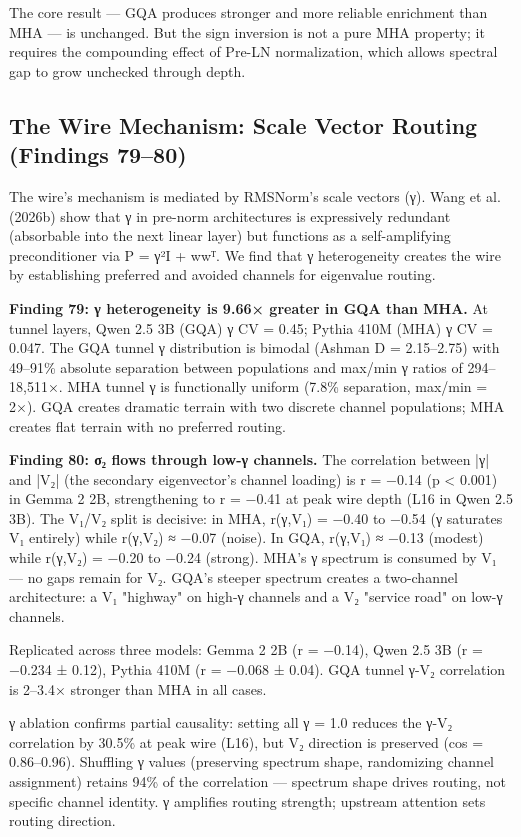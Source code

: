 \documentclass[12pt]{article}
\begin{document}
The core result — GQA produces stronger and more reliable enrichment than MHA — is unchanged. But the sign inversion is not a pure MHA property; it requires the compounding effect of Pre-LN normalization, which allows spectral gap to grow unchecked through depth.

\subsection{The Wire Mechanism: Scale Vector Routing (Findings 79–80)}

The wire's mechanism is mediated by RMSNorm's scale vectors (γ). Wang et al. (2026b) show that γ in pre-norm architectures is expressively redundant (absorbable into the next linear layer) but functions as a self-amplifying preconditioner via P = γ²I + wwᵀ. We find that γ heterogeneity creates the wire by establishing preferred and avoided channels for eigenvalue routing.

\textbf{Finding 79: γ heterogeneity is 9.66× greater in GQA than MHA.} At tunnel layers, Qwen 2.5 3B (GQA) γ CV = 0.45; Pythia 410M (MHA) γ CV = 0.047. The GQA tunnel γ distribution is bimodal (Ashman D = 2.15–2.75) with 49–91\% absolute separation between populations and max/min γ ratios of 294–18,511×. MHA tunnel γ is functionally uniform (7.8\% separation, max/min = 2×). GQA creates dramatic terrain with two discrete channel populations; MHA creates flat terrain with no preferred routing.

\textbf{Finding 80: σ₂ flows through low-γ channels.} The correlation between |γ| and |V₂| (the secondary eigenvector's channel loading) is r = −0.14 (p < 0.001) in Gemma 2 2B, strengthening to r = −0.41 at peak wire depth (L16 in Qwen 2.5 3B). The V₁/V₂ split is decisive: in MHA, r(γ,V₁) = −0.40 to −0.54 (γ saturates V₁ entirely) while r(γ,V₂) ≈ −0.07 (noise). In GQA, r(γ,V₁) ≈ −0.13 (modest) while r(γ,V₂) = −0.20 to −0.24 (strong). MHA's γ spectrum is consumed by V₁ — no gaps remain for V₂. GQA's steeper spectrum creates a two-channel architecture: a V₁ "highway" on high-γ channels and a V₂ "service road" on low-γ channels.

Replicated across three models: Gemma 2 2B (r = −0.14), Qwen 2.5 3B (r = −0.234 ± 0.12), Pythia 410M (r = −0.068 ± 0.04). GQA tunnel γ-V₂ correlation is 2–3.4× stronger than MHA in all cases.

γ ablation confirms partial causality: setting all γ = 1.0 reduces the γ-V₂ correlation by 30.5\% at peak wire (L16), but V₂ direction is preserved (cos = 0.86–0.96). Shuffling γ values (preserving spectrum shape, randomizing channel assignment) retains 94\% of the correlation — spectrum shape drives routing, not specific channel identity. γ amplifies routing strength; upstream attention sets routing direction.
\end{document}

